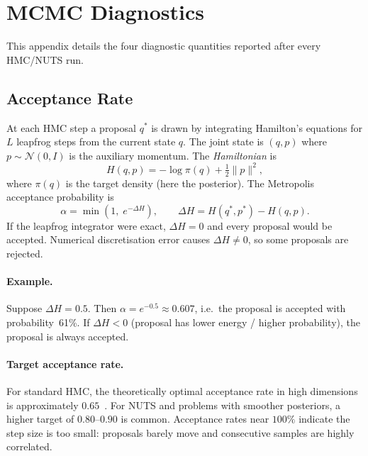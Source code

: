 \documentclass{article}
\begin{document}
\newpage

\section{MCMC Diagnostics}\label{APP:MCMC_Diagnostics}

This appendix details the four diagnostic quantities reported after every HMC/NUTS run.

\subsection{Acceptance Rate}

At each HMC step a proposal $q^*$ is drawn by integrating Hamilton's equations for $L$ leapfrog
steps from the current state $q$.  The joint state is $(q, p)$ where $p \sim \mathcal{N}(0, I)$ is
the auxiliary momentum.  The \emph{Hamiltonian} is
\begin{equation}
  H(q, p) = -\log \pi(q) + \tfrac{1}{2}\|p\|^2,
\end{equation}
where $\pi(q)$ is the target density (here the posterior).  The Metropolis acceptance probability is
\begin{equation}
  \alpha = \min\!\left(1,\; e^{-\Delta H}\right), \qquad
  \Delta H = H(q^*, p^*) - H(q, p).
\end{equation}
If the leapfrog integrator were exact, $\Delta H = 0$ and every proposal would be accepted.
Numerical discretisation error causes $\Delta H \neq 0$, so some proposals are rejected.

\paragraph{Example.}
Suppose $\Delta H = 0.5$.  Then $\alpha = e^{-0.5} \approx 0.607$, i.e.\ the proposal is accepted
with probability~61\%.  If $\Delta H < 0$ (proposal has lower energy / higher probability), the
proposal is always accepted.

\paragraph{Target acceptance rate.}
For standard HMC, the theoretically optimal acceptance rate in high dimensions is approximately
$0.65$~\cite{beskos2013optimal}.  For NUTS and problems with smoother posteriors, a higher target
of $0.80$--$0.90$ is common.  Acceptance rates near $100\%$ indicate the step size is too small:
proposals barely move and consecutive samples are highly correlated.
\end{document}
